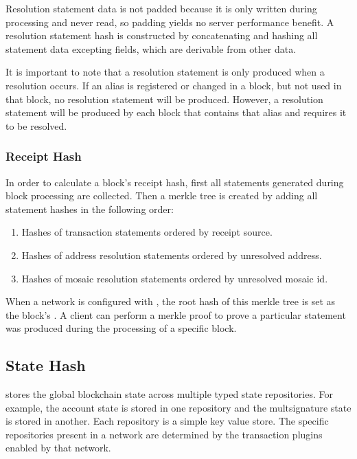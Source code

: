 Resolution statement data is not padded because it is only written during processing and never read, so padding yields no server performance benefit.
A resolution statement hash is constructed by concatenating and hashing all statement data excepting  fields, which are derivable from other data.

It is important to note that a resolution statement is only produced when a resolution occurs.
If an alias is registered or changed in a block, but not used in that block, no resolution statement will be produced.
However, a resolution statement will be produced by each block that contains that alias and requires it to be resolved.

\subsubsection{Receipt Hash}

In order to calculate a block's receipt hash, first all statements generated during block processing are collected.
Then a merkle tree is created by adding all statement hashes in the following order:

\begin{enumerate}
\item{Hashes of transaction statements ordered by receipt source.}
\item{Hashes of address resolution statements ordered by unresolved address.}
\item{Hashes of mosaic resolution statements ordered by unresolved mosaic id.}
\end{enumerate}

When a network is configured with , the root hash of this merkle tree is set as the block's .
A client can perform a merkle proof to prove a particular statement was produced during the processing of a specific block.

\subsection{State Hash}
\label{sec:blocks:statehash}

\codenamespace stores the global blockchain state across multiple typed state repositories.
For example, the account state is stored in one repository and the multsignature state is stored in another.
Each repository is a simple key value store.
The specific repositories present in a network are determined by the transaction plugins enabled by that network.

